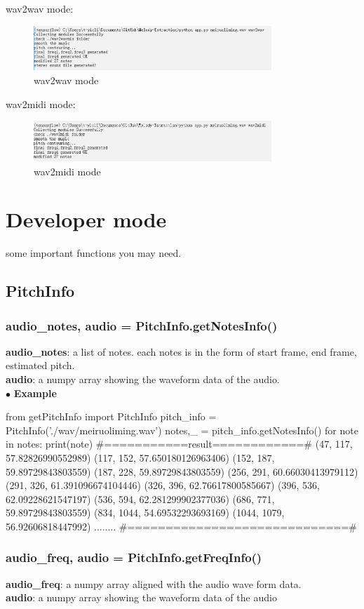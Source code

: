 \documentclass[twoside]{article}
\begin{document}
wav2wav mode:
\begin{figure}[H]
   \centering
   \includegraphics[width = 0.8\textwidth]{wav2wav.PNG}  
   \caption{wav2wav mode}
\end{figure}

wav2midi mode:
\begin{figure}[H]
   \centering
   \includegraphics[width = 0.8\textwidth]{wav2midi.PNG}  
   \caption{wav2midi mode}
\end{figure}

\section{Developer mode}
some important functions you may need. 

\subsection{PitchInfo}
\subsubsection{audio\_notes, audio = PitchInfo.getNotesInfo()}
\textbf{audio\_notes}: a list of notes. each notes is in the form of start frame, end frame, estimated pitch.\\
\textbf{audio}: a numpy array showing the waveform data of the audio. \\

\noindent $\bullet$ \textbf{Example}
\begin{python}
from getPitchInfo import PitchInfo
pitch_info = PitchInfo('./wav/meiruoliming.wav')
notes,_ = pitch_info.getNotesInfo()
for note in notes:
	print(note)
#===========result============#
(47, 117, 57.82826990552989)
(117, 152, 57.650180126963406)
(152, 187, 59.89729843803559)
(187, 228, 59.89729843803559)
(256, 291, 60.66030413979112)
(291, 326, 61.391096674104446)
(326, 396, 62.76617800585667)
(396, 536, 62.09228621547197)
(536, 594, 62.281299902377036)
(686, 771, 59.89729843803559)
(834, 1044, 54.69532293693169)
(1044, 1079, 56.92606818447992)
........
#=============================#
\end{python}

\subsubsection{audio\_freq, audio = PitchInfo.getFreqInfo()}
\textbf{audio\_freq}: a numpy array aligned with the audio wave form data.\\
\textbf{audio}: a numpy array showing the waveform data of the audio \\
\end{document}
